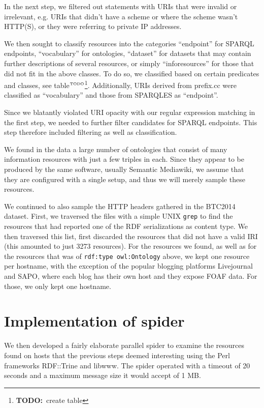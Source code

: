 \documentclass{llncs}
\newcommand{\rdfterm}[1]{\texttt{#1}}
\newcommand{\httph}[1]{\texttt{#1}}
\newcommand{\todo}[1]{\ensuremath{^{\textrm{\tiny{TODO}\normalsize}}}\footnote{\textbf{TODO:}~#1}}
\begin{document}
\begin{subappendices}
In the next step, we filtered out statements with URIs that were
invalid or irrelevant, e.g. URIs that didn't have a scheme or where
the scheme wasn't HTTP(S), or they were referring to private IP addresses.

We then sought to classify resources into the categories ``endpoint''
for SPARQL endpoints, ``vocabulary'' for ontologies, ``dataset'' for
datasets that may contain further descriptions of several resources,
or simply ``inforesources'' for those that did not fit in the above
classes. To do so, we classified based on certain predicates and
classes, see table\todo{create table}. Additionally, URIs derived from
prefix.cc were classified as ``vocabulary'' and those from SPARQLES as
``endpoint''.

Since we blatantly violated URI opacity with our regular expression
matching in the first step, we needed to further filter candidates for
SPARQL endpoints. This step therefore included filtering as well as
classification.

We found in the data a large number of ontologies that consist of many
information resources with just a few triples in each. Since they
appear to be produced by the same software, usually Semantic
Mediawiki, we assume that they are configured with a single setup, and
thus we will merely sample these resources.

We continued to also sample the HTTP headers gathered in the BTC2014
dataset. 
First, we traversed the files with a simple UNIX \texttt{grep} to find
the resources that had reported one of the RDF serializations as
content type. We then traversed this list, first discarded the
resources that did not have a valid IRI (this amounted to just 3273
resources). For the resources we found, as well as for the resources
that was of \rdfterm{rdf:type owl:Ontology} above, we kept one
resource per hostname, with the exception of the popular blogging
platforms Livejournal and SAPO, where each blog has their own host and
they expose FOAF data. For those, we only kept one hostname. 

\section{Implementation of spider}\label{app:fetcher}

We then developed a fairly elaborate parallel spider to examine the
resources found on hosts that the previous steps deemed interesting
using the Perl frameworks RDF::Trine and libwww. The spider operated
with a timeout of 20 seconds and a maximum message size it would
accept of 1 MB.


\end{subappendices}
\end{document}
